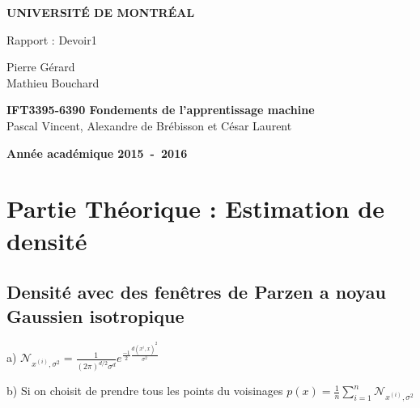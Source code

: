 \documentclass[a4paper,10pt]{article}
\begin{document}
\begin{titlepage}
\begin{center}
\textbf{\textsc{UNIVERSIT\'E DE MONTR\'EAL}}\\
\vfill{}\vfill{}
\begin{center}{\Huge Rapport : Devoir1 }\end{center}{\Huge \par}
\begin{center}{\large Pierre Gérard \\ Mathieu Bouchard}\end{center}{\Huge \par}
\vfill{}\vfill{} \vfill{}
\begin{center}{\large \textbf{IFT3395-6390 Fondements de l'apprentissage machine}}\hfill{\\Pascal Vincent, Alexandre de Brébisson et César Laurent}\end{center}{\large\par}
\vfill{}\vfill{}\enlargethispage{3cm}
\textbf{Année académique 2015~-~2016}
\end{center}
\end{titlepage}



\tableofcontents

\pagebreak

\section{Partie Théorique : Estimation de densité}

\subsection{Densité avec des fenêtres de Parzen a noyau Gaussien isotropique}

a) $\mathcal{N}_{x^{(i)}, \sigma^{2}} = \frac{1}{(2 \pi)^{d/2} \sigma^{d}} e^{ \frac{-1}{2} \frac{d(x^{i},x)^{2}}{\sigma^{2}} } $



b) Si on choisit de prendre tous les points du voisinages
$ p(x) =  \frac{1}{n} \sum_{i=1}^{n} \mathcal{N}_{x^{(i)}, \sigma^{2}} $
\end{document}
